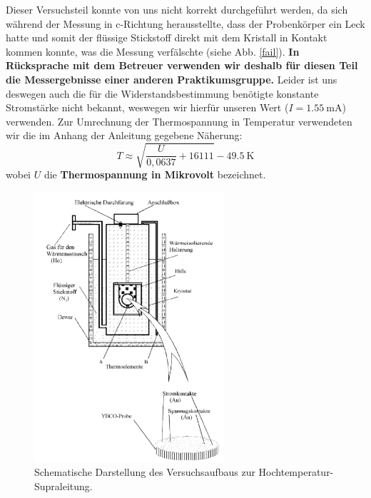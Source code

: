 Dieser Versuchsteil konnte von uns nicht korrekt durchgeführt werden, da sich während der Messung in c-Richtung herausstellte, dass der Probenkörper ein Leck hatte und somit der flüssige Stickstoff direkt mit dem Kristall in Kontakt kommen konnte, was die Messung verfälschte (siehe Abb. \ref{fail}). \textbf{In Rücksprache mit dem Betreuer verwenden wir deshalb für diesen Teil die Messergebnisse einer anderen Praktikumsgruppe.} Leider ist uns deswegen auch die für die Widerstandsbestimmung benötigte konstante Stromstärke nicht bekannt, weswegen wir hierfür unseren Wert ($ I= \SI{1,55}{\milli\ampere}$) verwenden. 
Zur Umrechnung der Thermospannung in Temperatur verwendeten wir die im Anhang der Anleitung gegebene Näherung:
\[T\approx \sqrt{\dfrac{U}{0,0637}+16111} - \SI{49,5}{\kelvin}\]
wobei $U$ die \textbf{Thermospannung in Mikrovolt} bezeichnet. 

\begin{figure}[H]
	\begin{center}
		\includegraphics[width=7cm]{hochtemp_aufbau.png}
		\caption{Schematische Darstellung des Versuchsaufbaus zur Hochtemperatur-Supraleitung.}
		\label{hoch_aufbau}
	\end{center}
\end{figure}

